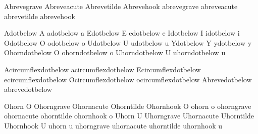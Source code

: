  Abrevegrave         {\Abreve}
 Abreveacute         {\Abreve}
 Abrevetilde         {\Abreve}
 Abrevehook          {\Abreve}
 abrevegrave         {\abreve}
 abreveacute         {\abreve}
 abrevetilde         {\abreve}
 abrevehook          {\abreve}

 Adotbelow           {\buildtextbottomdot A}
 adotbelow           {\buildtextbottomdot a}
 Edotbelow           {\buildtextbottomdot E}
 edotbelow           {\buildtextbottomdot e}
 Idotbelow           {\buildtextbottomdot I}
 idotbelow           {\buildtextbottomdot i}
 Odotbelow           {\buildtextbottomdot O}
 odotbelow           {\buildtextbottomdot o}
 Udotbelow           {\buildtextbottomdot U}
 udotbelow           {\buildtextbottomdot u}
 Ydotbelow           {\buildtextbottomdot Y}
 ydotbelow           {\buildtextbottomdot y}
 Ohorndotbelow       {\buildtextbottomdot O}
 ohorndotbelow       {\buildtextbottomdot o}
 Uhorndotbelow       {\buildtextbottomdot U}
 uhorndotbelow       {\buildtextbottomdot u}

 Acircumflexdotbelow {\buildtextbottomdot\Acircumflex}
 acircumflexdotbelow {\buildtextbottomdot\acircumflex}
 Ecircumflexdotbelow {\buildtextbottomdot\Ecircumflex}
 ecircumflexdotbelow {\buildtextbottomdot\ecircumflex}
 Ocircumflexdotbelow {\buildtextbottomdot\Ocircumflex}
 ocircumflexdotbelow {\buildtextbottomdot\ocircumflex}
 Abrevedotbelow      {\buildtextbottomdot\Abreve}
 abrevedotbelow      {\buildtextbottomdot\abreve}

 Ohorn               {O}
 Ohorngrave          {\Ograve}
 Ohornacute          {\Oacute}
 Ohorntilde          {\Otilde}
 Ohornhook           {O}
 ohorn               {o}
 ohorngrave          {\ograve}
 ohornacute          {\oacute}
 ohorntilde          {\otilde}
 ohornhook           {o}
 Uhorn               {U}
 Uhorngrave          {\Ugrave}
 Uhornacute          {\Uacute}
 Uhorntilde          {\Utilde}
 Uhornhook           {U}
 uhorn               {u}
 uhorngrave          {\ugrave}
 uhornacute          {\uacute}
 uhorntilde          {\utilde}
 uhornhook           {u}

